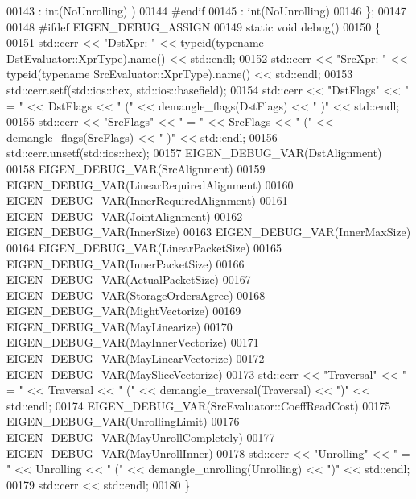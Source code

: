 \begin{DoxyCode}
00143                                          : int(NoUnrolling) )
00144 #endif
00145               : int(NoUnrolling)
00146   \};
00147 
00148 \textcolor{preprocessor}{#ifdef EIGEN\_DEBUG\_ASSIGN}
00149   \textcolor{keyword}{static} \textcolor{keywordtype}{void} debug()
00150   \{
00151     std::cerr << \textcolor{stringliteral}{"DstXpr: "} << \textcolor{keyword}{typeid}(\textcolor{keyword}{typename} DstEvaluator::XprType).name() << std::endl;
00152     std::cerr << \textcolor{stringliteral}{"SrcXpr: "} << \textcolor{keyword}{typeid}(\textcolor{keyword}{typename} SrcEvaluator::XprType).name() << std::endl;
00153     std::cerr.setf(std::ios::hex, std::ios::basefield);
00154     std::cerr << \textcolor{stringliteral}{"DstFlags"} << \textcolor{stringliteral}{" = "} << DstFlags << \textcolor{stringliteral}{" ("} << demangle\_flags(DstFlags) << \textcolor{stringliteral}{" )"} << std::endl;
00155     std::cerr << \textcolor{stringliteral}{"SrcFlags"} << \textcolor{stringliteral}{" = "} << SrcFlags << \textcolor{stringliteral}{" ("} << demangle\_flags(SrcFlags) << \textcolor{stringliteral}{" )"} << std::endl;
00156     std::cerr.unsetf(std::ios::hex);
00157     EIGEN\_DEBUG\_VAR(DstAlignment)
00158     EIGEN\_DEBUG\_VAR(SrcAlignment)
00159     EIGEN\_DEBUG\_VAR(LinearRequiredAlignment)
00160     EIGEN\_DEBUG\_VAR(InnerRequiredAlignment)
00161     EIGEN\_DEBUG\_VAR(JointAlignment)
00162     EIGEN\_DEBUG\_VAR(InnerSize)
00163     EIGEN\_DEBUG\_VAR(InnerMaxSize)
00164     EIGEN\_DEBUG\_VAR(LinearPacketSize)
00165     EIGEN\_DEBUG\_VAR(InnerPacketSize)
00166     EIGEN\_DEBUG\_VAR(ActualPacketSize)
00167     EIGEN\_DEBUG\_VAR(StorageOrdersAgree)
00168     EIGEN\_DEBUG\_VAR(MightVectorize)
00169     EIGEN\_DEBUG\_VAR(MayLinearize)
00170     EIGEN\_DEBUG\_VAR(MayInnerVectorize)
00171     EIGEN\_DEBUG\_VAR(MayLinearVectorize)
00172     EIGEN\_DEBUG\_VAR(MaySliceVectorize)
00173     std::cerr << \textcolor{stringliteral}{"Traversal"} << \textcolor{stringliteral}{" = "} << Traversal << \textcolor{stringliteral}{" ("} << demangle\_traversal(Traversal) << \textcolor{stringliteral}{")"} << 
      std::endl;
00174     EIGEN\_DEBUG\_VAR(SrcEvaluator::CoeffReadCost)
00175     EIGEN\_DEBUG\_VAR(UnrollingLimit)
00176     EIGEN\_DEBUG\_VAR(MayUnrollCompletely)
00177     EIGEN\_DEBUG\_VAR(MayUnrollInner)
00178     std::cerr << \textcolor{stringliteral}{"Unrolling"} << \textcolor{stringliteral}{" = "} << Unrolling << \textcolor{stringliteral}{" ("} << demangle\_unrolling(Unrolling) << \textcolor{stringliteral}{")"} << 
      std::endl;
00179     std::cerr << std::endl;
00180   \}

\end{DoxyCode}
